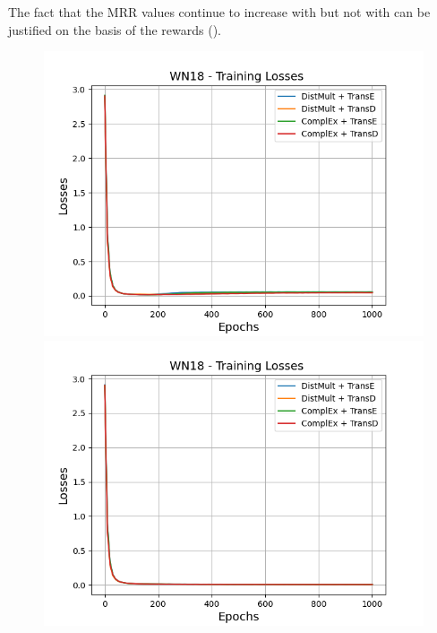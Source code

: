The fact that the MRR values continue to increase with \origsampling but not with \ussoftmax can be justified on the basis of the rewards ().
\begin{figure}
    \centering
    \begin{minipage}{.5\textwidth}
      \centering
      \includegraphics[width=0.9\linewidth]{figures/results/gan_train/not_pretrained/random/wn18/epochs1000/random_wn18_losses.png}
    \end{minipage}%
    \begin{minipage}{.5\textwidth}
      \centering
      \includegraphics[width=0.9\linewidth]{figures/results/gan_train/not_pretrained/uncertainty/max_distribution/entropy/wn18/1k_epochs/uncertainty_wn18_losses.png}
    \end{minipage}
    \begin{minipage}{.5\textwidth}

\end{minipage}
\end{figure}
